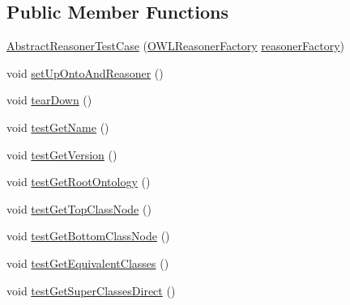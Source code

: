\subsection*{Public Member Functions}
\begin{DoxyCompactItemize}
\item 
\hyperlink{classorg_1_1semanticweb_1_1owlapi_1_1api_1_1test_1_1baseclasses_1_1_abstract_reasoner_test_case_a3396c2c7697693b9372172178ca8f1ec}{Abstract\-Reasoner\-Test\-Case} (\hyperlink{interfaceorg_1_1semanticweb_1_1owlapi_1_1reasoner_1_1_o_w_l_reasoner_factory}{O\-W\-L\-Reasoner\-Factory} \hyperlink{classorg_1_1semanticweb_1_1owlapi_1_1api_1_1test_1_1baseclasses_1_1_abstract_reasoner_test_case_a9341f8cf9351feeaf9c9f3792ef09b70}{reasoner\-Factory})
\item 
void \hyperlink{classorg_1_1semanticweb_1_1owlapi_1_1api_1_1test_1_1baseclasses_1_1_abstract_reasoner_test_case_a2e6f0068123840af2ee299f1894035fd}{set\-Up\-Onto\-And\-Reasoner} ()
\item 
void \hyperlink{classorg_1_1semanticweb_1_1owlapi_1_1api_1_1test_1_1baseclasses_1_1_abstract_reasoner_test_case_a770b3c3e6c2fc15e7a99c1b788b42118}{tear\-Down} ()
\item 
void \hyperlink{classorg_1_1semanticweb_1_1owlapi_1_1api_1_1test_1_1baseclasses_1_1_abstract_reasoner_test_case_a6175d58946e131bc886ddbb0bab3efd6}{test\-Get\-Name} ()
\item 
void \hyperlink{classorg_1_1semanticweb_1_1owlapi_1_1api_1_1test_1_1baseclasses_1_1_abstract_reasoner_test_case_a21bb704152ae9a884efb596b2ff2e108}{test\-Get\-Version} ()
\item 
void \hyperlink{classorg_1_1semanticweb_1_1owlapi_1_1api_1_1test_1_1baseclasses_1_1_abstract_reasoner_test_case_a8084435260ea8d0726fa50faa70a38bc}{test\-Get\-Root\-Ontology} ()
\item 
void \hyperlink{classorg_1_1semanticweb_1_1owlapi_1_1api_1_1test_1_1baseclasses_1_1_abstract_reasoner_test_case_a6366a23c545fc71fdfb7967ea319c500}{test\-Get\-Top\-Class\-Node} ()
\item 
void \hyperlink{classorg_1_1semanticweb_1_1owlapi_1_1api_1_1test_1_1baseclasses_1_1_abstract_reasoner_test_case_a1c709a50f1a58995d2931f228d781e0d}{test\-Get\-Bottom\-Class\-Node} ()
\item 
void \hyperlink{classorg_1_1semanticweb_1_1owlapi_1_1api_1_1test_1_1baseclasses_1_1_abstract_reasoner_test_case_a6ec58fb7888461756d4b59d6b8c6cce7}{test\-Get\-Equivalent\-Classes} ()
\item 
void \hyperlink{classorg_1_1semanticweb_1_1owlapi_1_1api_1_1test_1_1baseclasses_1_1_abstract_reasoner_test_case_aae9948b1a3a0207682005150ae9744bf}{test\-Get\-Super\-Classes\-Direct} ()

\end{DoxyCompactItemize}

